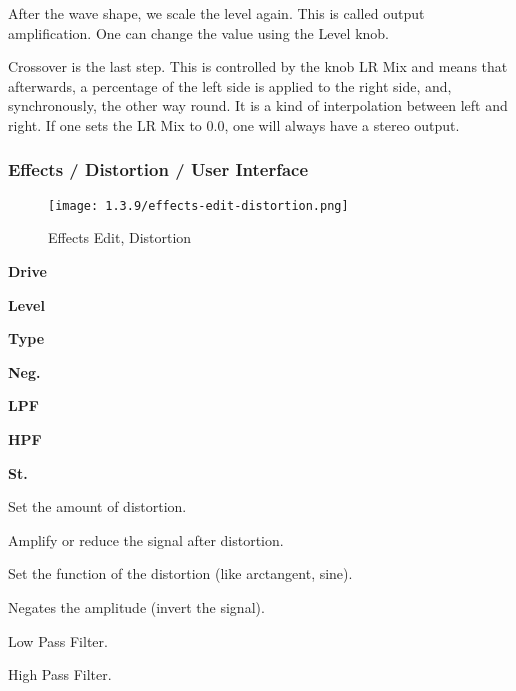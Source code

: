    After the wave shape, we scale the level again. This is called output
   amplification. One can change the value using the Level knob.

   Crossover is the last step. This is controlled by the knob LR Mix and
   means that afterwards, a percentage of the left side is applied to the
   right side, and, synchronously, the other way round. It is a kind of
   interpolation between left and right. If one sets the LR Mix to 0.0, one
   will always have a stereo output.

\subsubsection{Effects / Distortion / User Interface}
\label{subsubsec:effects_edit_distortion_ui}

\begin{figure}[H]
   \centering 
   \texttt{[image: 1.3.9/effects-edit-distortion.png]}
   \caption{Effects Edit, Distortion}
   \label{fig:effects_edit_distortion}
\end{figure}

   \begin{enumber}
      \item \textbf{Drive}
      \item \textbf{Level}
      \item \textbf{Type}
      \item \textbf{Neg.}
      \item \textbf{LPF}
      \item \textbf{HPF}
      \item \textbf{St.}
   \end{enumber}

   \setcounter{ItemCounter}{0}      %

   Set the amount of distortion.

   Amplify or reduce the signal after distortion.

   Set the function of the distortion (like arctangent, sine).

   Negates the amplitude (invert the signal).

   Low Pass Filter.

   High Pass Filter.


